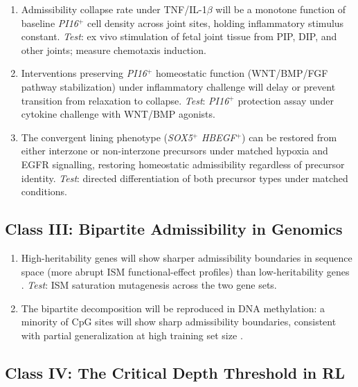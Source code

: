 \documentclass[12pt, a4paper, twoside]{book}
\theoremstyle{definition}
\theoremstyle{remark}
\newcommand{\gene}[1]{\textit{#1}}
\begin{document}
\begin{enumerate}[label=\textbf{P\arabic*.}, start=4]
  \item Admissibility collapse rate under TNF/IL-1$\beta$ will be a monotone function of baseline \gene{PI16}$^+$ cell density across joint sites, holding inflammatory stimulus constant. \textit{Test}: ex vivo stimulation of fetal joint tissue from PIP, DIP, and other joints; measure chemotaxis induction.

  \item Interventions preserving \gene{PI16}$^+$ homeostatic function (WNT/BMP/FGF pathway stabilization) under inflammatory challenge will delay or prevent transition from relaxation to collapse. \textit{Test}: \gene{PI16}$^+$ protection assay under cytokine challenge with WNT/BMP agonists.

  \item The convergent lining phenotype (\gene{SOX5}$^+$ \gene{HBEGF}$^+$) can be restored from either interzone or non-interzone precursors under matched hypoxia and EGFR signalling, restoring homeostatic admissibility regardless of precursor identity. \textit{Test}: directed differentiation of both precursor types under matched conditions.
\end{enumerate}

\subsection{Class III: Bipartite Admissibility in Genomics}

\begin{enumerate}[label=\textbf{P\arabic*.}, start=7]
  \item High-heritability genes will show sharper admissibility boundaries in sequence space (more abrupt ISM functional-effect profiles) than low-heritability genes \citep{spiro2026}. \textit{Test}: ISM saturation mutagenesis across the two gene sets.

  \item The bipartite decomposition will be reproduced in DNA methylation: a minority of CpG sites will show sharp admissibility boundaries, consistent with partial generalization at high training set size \citep{spiro2026}.
\end{enumerate}

\subsection{Class IV: The Critical Depth Threshold in RL}
\end{document}
